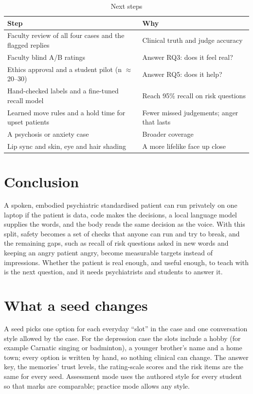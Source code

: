 \begin{table}[t]
\caption{Next steps}
\label{tab:next}
\centering
\scriptsize
\begin{tabularx}{\columnwidth}{@{}YY@{}}
\toprule
Step & Why\\
\midrule
Faculty review of all four cases and the flagged replies & Clinical truth and judge accuracy\\
Faculty blind A/B ratings & Answer RQ3: does it feel real?\\
Ethics approval and a student pilot (n $\approx$ 20--30) & Answer RQ5: does it help?\\
Hand-checked labels and a fine-tuned recall model & Reach 95\% recall on risk questions\\
Learned move rules and a hold time for upset patients & Fewer missed judgements; anger that lasts\\
A psychosis or anxiety case & Broader coverage\\
Lip sync and skin, eye and hair shading & A more lifelike face up close\\
\bottomrule
\end{tabularx}
\end{table}

\section{Conclusion}
A spoken, embodied psychiatric standardised patient can run privately on one laptop if the patient is data, code makes the decisions, a local
language model supplies the words, and the body reads the same decision as the voice. With this split, safety becomes a set of checks that anyone
can run and try to break, and the remaining gaps, such as recall of risk questions asked in new words and keeping an angry patient angry, become
measurable targets instead of impressions. Whether the patient is real enough, and useful enough, to teach with is the next question, and it
needs psychiatrists and students to answer it.

\appendices
\section{What a seed changes}
A seed picks one option for each everyday ``slot'' in the case and one conversation style allowed by the case. For the depression case the slots
include a hobby (for example Carnatic singing or badminton), a younger brother's name and a home town; every option is written by hand, so
nothing clinical can change. The answer key, the memories' trust levels, the rating-scale scores and the risk items are the same for every seed.
Assessment mode uses the authored style for every student so that marks are comparable; practice mode allows any style.

